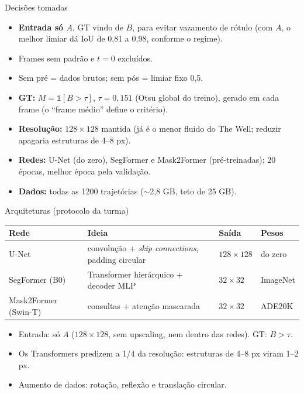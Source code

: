 \documentclass[aspectratio=169,10pt]{beamer}
\begin{document}
\begin{frame}{Decisões tomadas}
  \begin{itemize}
    \item \textbf{Entrada só $A$}, GT vindo de $B$, para evitar vazamento de rótulo
      (com $A$, o melhor limiar dá IoU de 0,81 a 0,98, conforme o regime).
    \item Frames sem padrão e $t = 0$ excluídos.
    \item Sem pré = dados brutos; sem pós = limiar fixo 0,5.
    \item \textbf{GT:} $M=\mathbb{1}[B>\tau]$, $\tau=0{,}151$ (Otsu global do treino), gerado em cada frame
      (o ``frame médio'' define o critério).
    \item \textbf{Resolução:} $128\times128$ mantida (já é o menor fluido do The Well; reduzir apagaria estruturas de 4--8 px).
    \item \textbf{Redes:} U-Net (do zero), SegFormer e Mask2Former (pré-treinadas); 20 épocas, melhor época pela validação.
    \item \textbf{Dados:} todas as 1200 trajetórias (${\sim}$2,8 GB, teto de 25 GB).
  \end{itemize}
\end{frame}

\begin{frame}{Arquiteturas (protocolo da turma)}
  \begin{tabular}{llll}
    \toprule
    Rede & Ideia & Saída & Pesos \\
    \midrule
    U-Net & convolução + \emph{skip connections}, padding circular & $128\times128$ & do zero \\
    SegFormer (B0) & Transformer hierárquico + decoder MLP & $32\times32$ & ImageNet \\
    Mask2Former (Swin-T) & consultas + atenção mascarada & $32\times32$ & ADE20K \\
    \bottomrule
  \end{tabular}
  \vspace{0.6em}
  \begin{itemize}
    \item Entrada: só $A$ ($128\times128$, sem upscaling, nem dentro das redes). GT: $B>\tau$.
    \item Os Transformers predizem a 1/4 da resolução: estruturas de 4--8 px viram 1--2 px.
    \item Aumento de dados: rotação, reflexão e translação circular.
  \end{itemize}
\end{frame}
\end{document}
